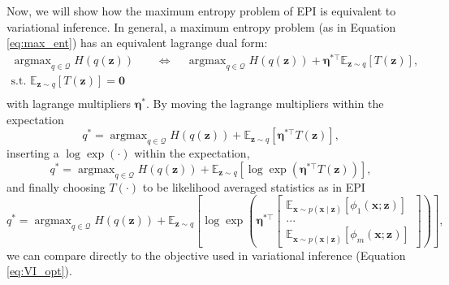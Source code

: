 \documentclass[11pt]{article}
\DeclareMathOperator*{\argmax}{argmax}
\begin{document}
Now, we will show how the maximum entropy problem of EPI is equivalent to variational inference.
In general, a maximum entropy problem (as in Equation \ref{eq:max_ent}) has an equivalent lagrange dual form:
\begin{equation}
\begin{split}
\argmax_{q \in \mathcal{Q}} H(q(\mathbf{z})) ~~~~~&\Longleftrightarrow ~~~~~\argmax_{q \in \mathcal{Q}} H(q(\mathbf{z})) + \bm{\eta}^{*\top} \mathbb{E}_{\mathbf{z} \sim q} \left[ T(\mathbf{z}) \right], \\
  \text{s.t.  } \mathbb{E}_{\mathbf{z} \sim q}\left[T(\mathbf{z})\right] = \mathbf{0}~~~~~& \\
 \end{split}
\end{equation} 
with lagrange multipliers $\bm{\eta}^*$.
By moving the lagrange multipliers within the expectation
\begin{equation}q^* = \argmax_{q \in \mathcal{Q}} H(q(\mathbf{z})) + \mathbb{E}_{\mathbf{z} \sim q} \left[\bm{\eta}^{*\top} T(\mathbf{z}) \right],
\end{equation} 
inserting a $\log \exp(\cdot)$ within the expectation, 
\begin{equation} q^* = \argmax_{q \in \mathcal{Q}} H(q(\mathbf{z})) + \mathbb{E}_{\mathbf{z} \sim q} \left[\log \exp \left( \bm{\eta}^{*\top} T(\mathbf{z}) \right) \right],
\end{equation}
and finally choosing $T(\cdot)$ to be likelihood averaged statistics as in EPI
\begin{equation} \label{eq:epi_vi}
q^* = \argmax_{q \in \mathcal{Q}} H(q(\mathbf{z})) + \mathbb{E}_{\mathbf{z} \sim q} \left[\log \exp \left( \bm{\eta}^{*\top} \begin{bmatrix} \mathbb{E}_{\mathbf{x} \sim p(\mathbf{x} \mid \mathbf{z})} \left[ \phi_1(\mathbf{x}; \mathbf{z}) \right] \\ ... \\ \mathbb{E}_{\mathbf{x} \sim p(\mathbf{x} \mid \mathbf{z})} \left[ \phi_m(\mathbf{x}; \mathbf{z}) \right] \end{bmatrix} \right) \right],
\end{equation}
we can compare directly to the objective used in variational inference  (Equation \ref{eq:VI_opt}).
\end{document}

